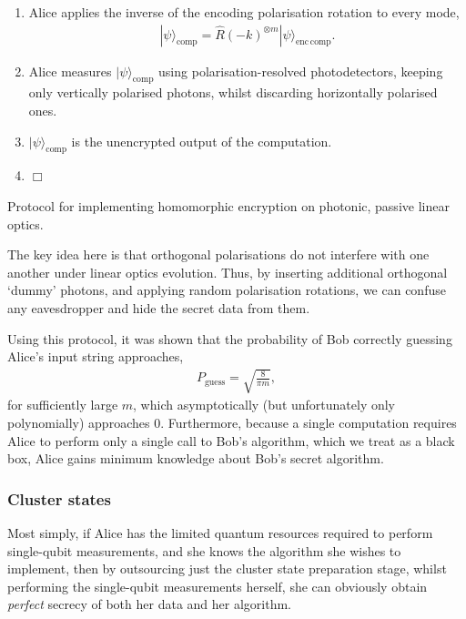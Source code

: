 \documentclass[aps,rmp,twocolumn,amsmath,amssymb,nofootinbib,superscriptaddress]{revtex4}
\newcommand{\ket}[1]{|#1\rangle}
\newcommand{\comment}[1]{{\color{blue}{\textbf{#1}}}}
\begin{document}
\begin{table}[!htb]
{{\begin{enumerate}
    \item Alice applies the inverse of the encoding polarisation rotation to every mode,
    \begin{align}
    \ket\psi_\mathrm{comp} = \hat{R}(-k)^{\otimes m}\ket\psi_\mathrm{enc\,comp}.
    \end{align}
    \item Alice measures $\ket\psi_\mathrm{comp}$ using polarisation-resolved photodetectors, keeping only vertically polarised photons, whilst discarding horizontally polarised ones.
    \item $\ket\psi_\mathrm{comp}$ is the unencrypted output of the computation.
    \item $\Box$
\end{enumerate}}}
\caption{Protocol for implementing homomorphic encryption on photonic, passive linear optics.} \label{tab:homo_LO}
\end{table}

The key idea here is that orthogonal polarisations do not interfere with one another under linear optics evolution. Thus, by inserting additional orthogonal `dummy' photons, and applying random polarisation rotations, we can confuse any eavesdropper and hide the secret data from them.

Using this protocol, it was shown that the probability of Bob correctly guessing Alice's input string approaches,
\begin{align}
P_\mathrm{guess} = \sqrt{\frac{8}{\pi m}},
\end{align}
for sufficiently large $m$, which asymptotically (but unfortunately only polynomially) approaches 0. Furthermore, because a single computation requires Alice to perform only a single call to Bob's algorithm, which we treat as a black box, Alice gains minimum knowledge about Bob's secret algorithm.

%
%

\subsubsection{Cluster states}

\comment{To do}

Most simply, if Alice has the limited quantum resources required to perform single-qubit measurements, and she knows the algorithm she wishes to implement, then by outsourcing just the cluster state preparation stage, whilst performing the single-qubit measurements herself, she can obviously obtain \emph{perfect} secrecy of both her data and her algorithm.
\end{document}
